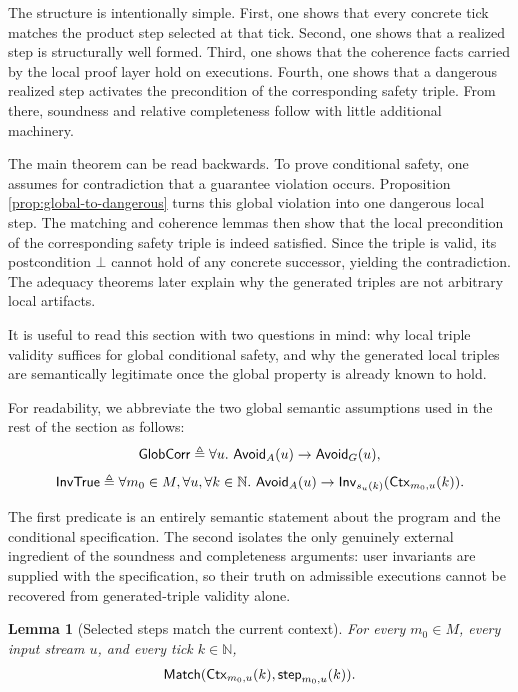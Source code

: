 \documentclass[acmsmall,screen]{acmart}
\theoremstyle{leftplain}
\newtheorem{lemma}[theorem]{Lemma}
\theoremstyle{leftdefinition}
\theoremstyle{leftremark}
\begin{document}
The structure is intentionally simple. First, one shows that every concrete
tick matches the product step selected at that tick. Second, one shows that a
realized step is structurally well formed. Third, one shows that the coherence
facts carried by the local proof layer hold on executions. Fourth, one shows
that a dangerous realized step activates the precondition of the corresponding
safety triple. From there, soundness and relative completeness follow with
little additional machinery.

\noindent{}
The main theorem can be read backwards. To prove conditional safety, one assumes
for contradiction that a guarantee violation occurs. Proposition
\ref{prop:global-to-dangerous} turns this global violation into one dangerous
local step. The matching and coherence lemmas then show that the local
precondition of the corresponding safety triple is indeed satisfied. Since the
triple is valid, its postcondition $\bot$ cannot hold of any concrete
successor, yielding the contradiction. The adequacy theorems later explain why
the generated triples are not arbitrary local artifacts.

It is useful to read this section with two questions in mind: why local triple
validity suffices for global conditional safety, and why the generated local
triples are semantically legitimate once the global property is already known
to hold.

For readability, we abbreviate the two global semantic assumptions used in the
rest of the section as follows:
\[
  \mathsf{GlobCorr} \triangleq
  \forall u.\ \mathsf{Avoid}_A(u) \rightarrow \mathsf{Avoid}_G(u),
\]
\[
  \mathsf{InvTrue} \triangleq
  \forall m_0 \in M,\forall u,\forall k \in \mathbb{N}.\
  \mathsf{Avoid}_A(u) \rightarrow \mathsf{Inv}_{s_u(k)}(\mathsf{Ctx}_{m_0,u}(k)).
\]

The first predicate is an entirely semantic statement about the program and the
conditional specification. The second isolates the only genuinely external
ingredient of the soundness and completeness arguments: user invariants are
supplied with the specification, so their truth on admissible executions cannot be
recovered from generated-triple validity alone.

\begin{lemma}[Selected steps match the current context]
\label{lem:matching}
For every $m_0 \in M$, every input stream $u$, and every tick
$k \in \mathbb{N}$,
\[
  \mathsf{Match}(\mathsf{Ctx}_{m_0,u}(k), \mathsf{step}_{m_0,u}(k)).
\]
\end{lemma}
\end{document}
